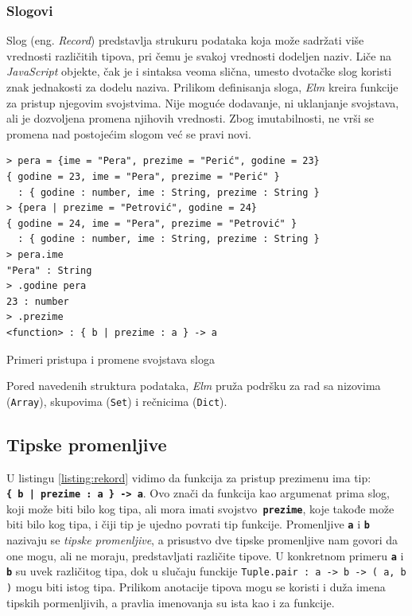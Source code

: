 \documentclass[12pt,oneside]{memoir}
\begin{document}
\subsubsection{Slogovi} 
Slog (eng. \emph{Record}) predstavlja strukuru podataka koja može sadržati više vrednosti različitih tipova, 
pri čemu je svakoj vrednosti dodeljen naziv. Liče na \emph{JavaScript} objekte, čak je i 
sintaksa veoma slična, umesto dvotačke slog koristi znak jednakosti za dodelu naziva.
Prilikom definisanja sloga, \emph{Elm} kreira funkcije za pristup njegovim svojstvima. Nije 
moguće dodavanje, ni uklanjanje svojstava, ali je dozvoljena promena njihovih vrednosti.
Zbog imutabilnosti, ne vrši se promena nad postojećim slogom već se pravi novi.
\begin{listing}[h]
\begin{verbatim}
> pera = {ime = "Pera", prezime = "Perić", godine = 23}
{ godine = 23, ime = "Pera", prezime = "Perić" } 
  : { godine : number, ime : String, prezime : String }
> {pera | prezime = "Petrović", godine = 24}
{ godine = 24, ime = "Pera", prezime = "Petrović" }
  : { godine : number, ime : String, prezime : String }
> pera.ime
"Pera" : String
> .godine pera
23 : number
> .prezime
<function> : { b | prezime : a } -> a
\end{verbatim}
\caption{Primeri pristupa i promene svojstava sloga}
\label{listing:rekord}
\end{listing}

Pored navedenih struktura podataka, \emph{Elm} pruža podršku za rad sa nizovima (\texttt{Array}),
skupovima (\texttt{Set}) i rečnicima (\texttt{Dict}).

\subsection{Tipske promenljive} 
U listingu \ref{listing:rekord} vidimo da funkcija za pristup prezimenu ima tip:\\ 
\texttt{\textbf{\{ b | prezime : a \} -> a}}. Ovo znači da funkcija kao argumenat
prima slog, koji može biti bilo kog tipa, ali mora imati svojstvo\texttt{\textbf{
prezime}}, koje takođe može biti bilo kog tipa, i čiji tip je ujedno povrati tip 
funkcije. Promenljive \texttt{\textbf{a}} i \texttt{\textbf{b}} nazivaju se 
\emph{tipske promenljive}, a prisustvo dve tipske promenljive nam govori da one mogu, 
ali ne moraju, predstavljati različite tipove. U konkretnom primeru \texttt{\textbf{a}}
i \texttt{\textbf{b}} su uvek različitog tipa, dok u slučaju funckije \texttt{Tuple.pair
: a -> b -> ( a, b )} mogu biti istog tipa. Prilikom anotacije tipova mogu se koristi i
duža imena tipskih pormenljivih, a pravlia imenovanja su ista kao i za funkcije.
\end{document}
